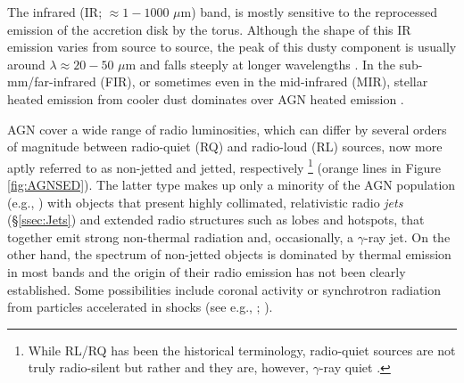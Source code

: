 

The infrared (IR; $\approx 1-1000$ $\mu$m) band, is mostly sensitive to the reprocessed emission of the accretion disk by the torus. Although the shape of this IR emission varies from source to source, the peak of this dusty component is usually around $\lambda \approx 20-50$ $\mu$m and falls steeply at longer wavelengths \parencite{Harrison2014PhDThesis}. In the sub-mm/far-infrared (FIR), or sometimes even in the mid-infrared (MIR), stellar heated emission from cooler dust dominates over AGN heated emission \parencite{Lutz2014SFRDust}. 

AGN cover a wide range of radio luminosities, which can differ by several orders of magnitude between radio-quiet (RQ) and radio-loud (RL) sources, now more aptly referred to as non-jetted and jetted, respectively \footnote{While RL/RQ has been the historical terminology, radio-quiet sources are not truly radio-silent but rather  and they are, however, $\gamma$-ray quiet \parencite{Padovani2017Onthe2mainclasses}.} (orange lines in Figure \ref{fig:AGNSED}). The latter type makes up only a minority of the AGN population (e.g., \cite{Padovani2011Non-JettedAGNPop}) with objects that present highly collimated, relativistic radio \textit{jets} (\S \ref{ssec:Jets}) and extended radio structures such as lobes and hotspots, that together emit strong non-thermal radiation and, occasionally, a $\gamma$-ray jet. On the other hand, the spectrum of non-jetted objects is dominated by thermal emission in most bands and the origin of their radio emission has not been clearly established. Some possibilities include coronal activity or synchrotron radiation from particles accelerated in shocks (see e.g., \cite{Laor2008RQEmission}; \cite{Ishibashi2011RadioQuietAGN}).


